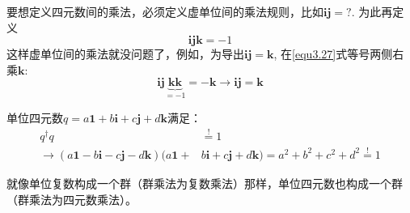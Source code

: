 要想定义四元数间的乘法，必须定义虚单位间的乘法规则，比如$\mathbf{ij} = ?$. 为此再定义
\begin{equation}
\label{equ3.27}
\mathbf{ijk} = -1
\end{equation}
这样虚单位间的乘法就没问题了，例如，为导出$\mathbf{ij} = \mathbf{k}$, 在\eqref{equ3.27}式等号两侧右乘$\mathbf{k}$:
\begin{equation}
\label{equ3.28}
\mathbf{ij} \underbrace{\mathbf{kk}}_{= -1} = -\mathbf{k} \rightarrow \mathbf{ij} = \mathbf{k}
\end{equation}

单位四元数$q = a\mathbf{1} + b\mathbf{i} + c\mathbf{j} + d\mathbf{k}$满足：
\begin{align}
q^\dag q &\stackrel{!}{=} 1 \nonumber\\
\label{equ3.29}
\rightarrow (a\mathbf{1} - b\mathbf{i} - c\mathbf{j} - d\mathbf{k}) (a\mathbf{1} +& b\mathbf{i} + c\mathbf{j} + d\mathbf{k}) = a^2 + b^2 + c^2 + d^2 \stackrel{!}{=} 1
\end{align}

就像单位复数构成一个群（群乘法为复数乘法）那样，单位四元数也构成一个群（群乘法为四元数乘法）。

